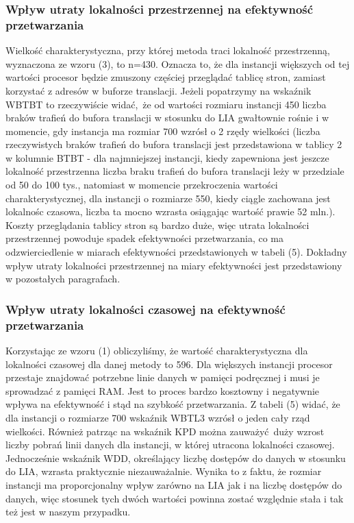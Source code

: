 \documentclass[10pt,a4paper]{article}
\begin{document}
\subsubsection*{Wpływ utraty lokalności przestrzennej na efektywność przetwarzania}
Wielkość charakterystyczna, przy której metoda traci lokalność przestrzenną, wyznaczona ze wzoru (3), to n=430. Oznacza to, że dla instancji większych od
tej wartości procesor będzie zmuszony częściej przeglądać tablicę stron, zamiast korzystać z adresów w buforze translacji. 
Jeżeli popatrzymy na wskaźnik WBTBT to rzeczywiście widać, że od wartości rozmiaru instancji 450 liczba braków trafień 
do bufora translacji w stosunku do LIA gwałtownie rośnie i w momencie, gdy instancja ma rozmiar 700 wzrósł o 2 rzędy wielkości 
(liczba rzeczywistych braków trafień do bufora translacji jest przedstawiona w tablicy 2 w kolumnie BTBT - dla najmniejszej
instancji, kiedy zapewniona jest jeszcze lokalność przestrzenna liczba braku trafień do bufora translacji
leży w przedziale od 50 do 100 tys., natomiast w momencie przekroczenia wartości charakterystycznej, 
dla instancji o rozmiarze 550, kiedy ciągle zachowana jest lokalnośc czasowa, liczba ta mocno wzrasta 
osiągając wartość prawie 52 mln.). Koszty przeglądania tablicy stron są bardzo duże, więc utrata lokalności przestrzennej 
powoduje spadek efektywności przetwarzania, co ma odzwierciedlenie w miarach efektywności przedstawionych w tabeli (5). 
Dokładny wpływ utraty lokalności przestrzennej na miary efektywności jest przedstawiony w pozostałych paragrafach. 

\subsubsection*{Wpływ utraty lokalności czasowej na efektywność przetwarzania}
Korzystając ze wzoru (1) obliczyliśmy, że wartość charakterystyczna dla lokalności czasowej dla danej metody to 596. Dla większych 
instancji procesor przestaje znajdować potrzebne linie danych w pamięci podręcznej i musi je sprowadzać 
z pamięci RAM. Jest to proces bardzo kosztowny i negatywnie wpływa na efektywność i stąd na szybkość przetwarzania.
Z tabeli (5) widać, że dla instancji o rozmiarze 700 wskaźnik WBTL3 wzrósł o jeden cały rząd wielkości. Również patrząc na 
wskaźnik KPD można zauważyć duży wzrost liczby pobrań linii danych dla instancji, w której utracona lokalności czasowej. \\

Jednocześnie wskaźnik WDD, określający liczbę dostępów do danych w stosunku do LIA, wzrasta praktycznie niezauważalnie. 
Wynika to z faktu, że rozmiar instancji ma proporcjonalny wpływ zarówno na LIA jak i na liczbę dostępów do danych, więc stosunek 
tych dwóch wartości powinna zostać względnie stała i tak też jest w naszym przypadku. 
\end{document}
